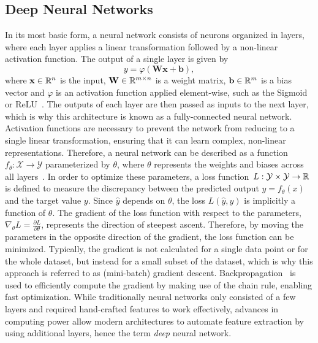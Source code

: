 \subsection{Deep Neural Networks}

In its most basic form, a neural network consists of neurons organized in layers, where each layer applies a linear transformation followed by a non-linear activation function.
The output of a single layer is given by
\begin{equation}
    y = \varphi(\mathbf{W}\mathbf{x} + \mathbf{b}),
\end{equation}
where $\mathbf{x} \in \mathbb{R}^n$ is the input, $\mathbf{W} \in \mathbb{R}^{m \times n}$ is a weight matrix, $\mathbf{b} \in \mathbb{R}^m$ is a bias vector and $\varphi$ is an activation function applied element-wise, such as the Sigmoid or ReLU~\cite{ReLU}.
The outputs of each layer are then passed as inputs to the next layer, which is why this architecture is known as a fully-connected neural network. 
Activation functions are necessary to prevent the network from reducing to a single linear transformation, ensuring that it can learn complex, non-linear representations.
Therefore, a neural network can be described as a function~$f_{\theta}: \mathcal{X} \rightarrow \mathcal{Y}$ parameterized by $\theta$, where $\theta$ represents the weights and biases across all layers~\cite{DeepLearning}.
In order to optimize these parameters, a loss function~$L: \mathcal{Y} \times \mathcal{Y} \rightarrow \mathbb{R}$ is defined to measure the discrepancy between the predicted output $\hat{y} = f_\theta(x)$ and the target value $y$. 
Since $\hat{y}$ depends on $\theta$, the loss $L(\hat{y}, y)$ is implicitly a function of $\theta$.
The gradient of the loss function with respect to the parameters, $\nabla_\theta L = \frac{\partial L}{\partial \theta}$, represents the direction of steepest ascent.
Therefore, by moving the parameters in the opposite direction of the gradient, the loss function can be minimized.
Typically, the gradient is not calculated for a single data point or for the whole dataset, but instead for a small subset of the dataset, which is why this approach is referred to as (mini-batch) gradient descent.
Backpropagation~\cite{Backpropagation} is used to efficiently compute the gradient by making use of the chain rule, enabling fast optimization.
While traditionally neural networks only consisted of a few layers and required hand-crafted features to work effectively, advances in computing power allow modern architectures to automate feature extraction by using additional layers, hence the term \textit{deep} neural network.

